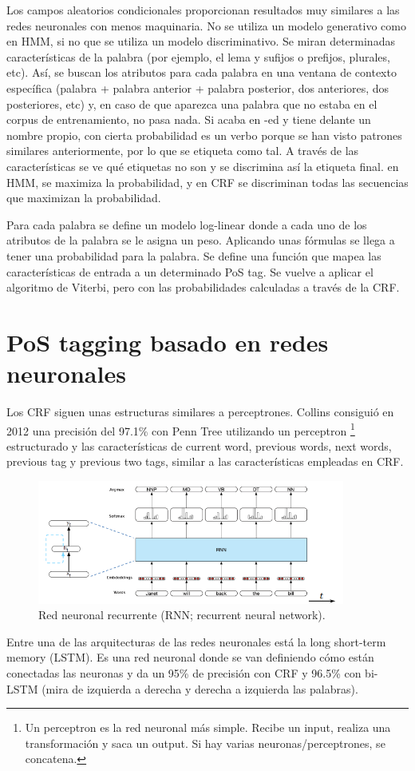 Los campos aleatorios condicionales proporcionan resultados muy similares a las redes neuronales con menos maquinaria. No se utiliza un modelo generativo como en HMM, si no que se utiliza un modelo discriminativo. Se miran determinadas características de la palabra (por ejemplo, el lema y sufijos o prefijos, plurales, etc). Así, se buscan los atributos para cada palabra en una ventana de contexto específica (palabra + palabra anterior + palabra posterior, dos anteriores, dos posteriores, etc) y, en caso de que aparezca una palabra que no estaba en el corpus de entrenamiento, no pasa nada. Si acaba en -ed y tiene delante un nombre propio, con cierta probabilidad es un verbo porque se han visto patrones similares anteriormente, por lo que se etiqueta como tal. A través de las características se ve qué etiquetas no son y se discrimina así la etiqueta final. en HMM, se maximiza la probabilidad, y en CRF se discriminan todas las secuencias que maximizan la probabilidad.

Para cada palabra se define un modelo log-linear donde a cada uno de los atributos de la palabra se le asigna un peso. Aplicando unas fórmulas se llega a tener una probabilidad para la palabra. Se define una función que mapea las características de entrada a un determinado PoS tag. Se vuelve a aplicar el algoritmo de Viterbi, pero con las probabilidades calculadas a través de la CRF.

\section{PoS tagging basado en redes neuronales}
Los CRF siguen unas estructuras similares a perceptrones. Collins consiguió en 2012 una precisión del 97.1\% con Penn Tree utilizando un perceptron \footnote{Un perceptron es la red neuronal más simple. Recibe un input, realiza una transformación y saca un output. Si hay varias neuronas/perceptrones, se concatena.} estructurado y las características de current word, previous words, next words, previous tag y previous two tags, similar a las características empleadas en CRF.

\begin{figure}[h]
\centering
\includegraphics[width = 0.9\textwidth]{figs/rnn.png}
\caption{Red neuronal recurrente (RNN; recurrent neural network).}
\end{figure}

Entre una de las arquitecturas de las redes neuronales está la long short-term memory (LSTM). Es una red neuronal donde se van definiendo cómo están conectadas las neuronas y da un 95\% de precisión con CRF y 96.5\% con bi-LSTM (mira de izquierda a derecha y derecha a izquierda las palabras).